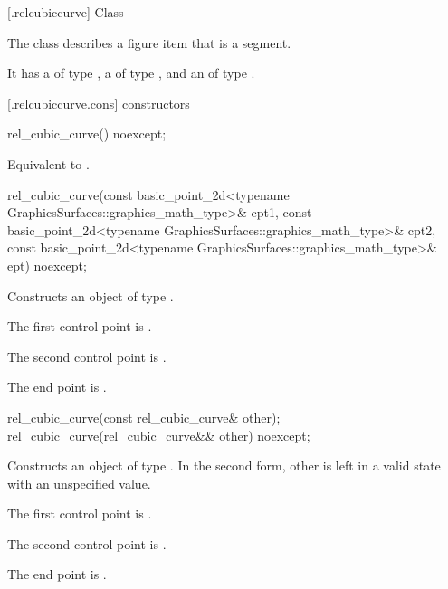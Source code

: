  [\iotwod.relcubiccurve] {Class }

\pnum
{}%
The class  describes a figure item that is a segment.

\pnum
It has a  of type , a  of type , and an  of type .

 [\iotwod.relcubiccurve.cons] { constructors}

%
\begin{itemdecl}
rel_cubic_curve() noexcept;
\end{itemdecl}
\begin{itemdescr}
\pnum
\effects
Equivalent to .
\end{itemdescr}

%
\begin{itemdecl}
rel_cubic_curve(const basic_point_2d<typename GraphicsSurfaces::graphics_math_type>& cpt1,
  const basic_point_2d<typename GraphicsSurfaces::graphics_math_type>& cpt2,
  const basic_point_2d<typename GraphicsSurfaces::graphics_math_type>& ept) noexcept;
\end{itemdecl}
\begin{itemdescr}
\pnum
\effects
Constructs an object of type .

\pnum
The first control point is .

\pnum
The second control point is .

\pnum
The end point is .
\end{itemdescr}

%
\begin{itemdecl}
rel_cubic_curve(const rel_cubic_curve& other);
rel_cubic_curve(rel_cubic_curve&& other) noexcept;
\end{itemdecl}
\begin{itemdescr}
\pnum
\effects
Constructs an object of type . In the second form, other is left in a valid state with an unspecified value.

\pnum
The first control point is .

\pnum
The second control point is .

\pnum
The end point is .
\end{itemdescr}

